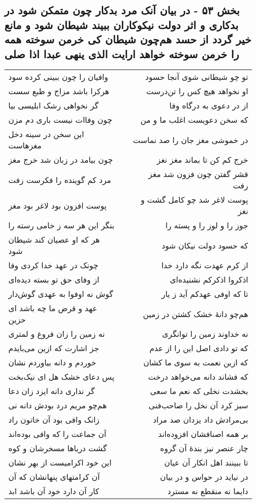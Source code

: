 \begin{center}
\section*{بخش ۵۳ - در بیان آنک مرد بدکار چون متمکن شود در بدکاری و اثر دولت نیکوکاران ببیند شیطان شود و مانع خیر گردد از حسد هم‌چون شیطان کی خرمن سوخته همه را خرمن سوخته خواهد ارایت الذی  ینهی عبدا اذا صلی}
\label{sec:sh053}
\begin{longtable}{l p{0.5cm} r}
وافیان را چون ببینی کرده سود
&&
تو چو شیطانی شوی آنجا حسود
\\
هرکرا باشد مزاج و طبع سست
&&
او نخواهد هیچ کس را تن‌درست
\\
گر نخواهی رشک ابلیسی بیا
&&
از در دعوی به درگاه وفا
\\
چون وفاات نیست باری دم مزن
&&
که سخن دعویست اغلب ما و من
\\
این سخن در سینه دخل مغزهاست
&&
در خموشی مغز جان را صد نماست
\\
چون بیامد در زبان شد خرج مغز
&&
خرج کم کن تا بماند مغز نغز
\\
مرد کم گوینده را فکرست زفت
&&
قشر گفتن چون فزون شد مغز رفت
\\
پوست افزون بود لاغر بود مغز
&&
پوست لاغر شد چو کامل گشت و نغز
\\
بنگر این هر سه ز خامی رسته را
&&
جوز را و لوز را و پسته را
\\
هر که او عصیان کند شیطان شود
&&
که حسود دولت نیکان شود
\\
چونک در عهد خدا کردی وفا
&&
از کرم عهدت نگه دارد خدا
\\
از وفای حق تو بسته دیده‌ای
&&
اذکروا اذکرکم نشنیده‌ای
\\
گوش نه اوفوا به عهدی گوش‌دار
&&
تا که اوفی عهدکم آید ز یار
\\
عهد و قرض ما چه باشد ای حزین
&&
هم‌چو دانهٔ خشک کشتن در زمین
\\
نه زمین را زان فروغ و لمتری
&&
نه خداوند زمین را توانگری
\\
جز اشارت که ازین می‌بایدم
&&
که تو دادی اصل این را از عدم
\\
خوردم و دانه بیاوردم نشان
&&
که ازین نعمت به سوی ما کشان
\\
پس دعای خشک هل ای نیک‌بخت
&&
که فشاند دانه می‌خواهد درخت
\\
گر نداری دانه ایزد زان دعا
&&
بخشدت نخلی که نعم ما سعی
\\
هم‌چو مریم درد بودش دانه نی
&&
سبز کرد آن نخل را صاحب‌فنی
\\
زانک وافی بود آن خاتون راد
&&
بی‌مرادش داد یزدان صد مراد
\\
آن جماعت را که وافی بوده‌اند
&&
بر همه اصنافشان افزوده‌اند
\\
گشت دریاها مسخرشان و کوه
&&
چار عنصر نیز بندهٔ آن گروه
\\
این خود اکرامیست از بهر نشان
&&
تا ببینند اهل انکار آن عیان
\\
آن کرامتهای پنهانشان که آن
&&
در نیاید در حواس و در بیان
\\
کار آن دارد خود آن باشد ابد
&&
دایما نه منقطع نه مسترد
\\
\end{longtable}
\end{center}
